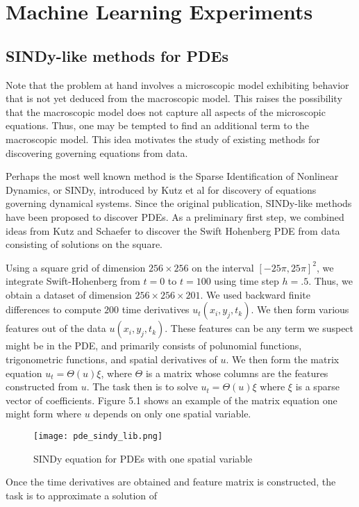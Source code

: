 \documentclass[12pt]{article}
\numberwithin{equation}{section}
\begin{document}
\section{Machine Learning Experiments}
\subsection{SINDy-like methods for PDEs}
\par Note that the problem at hand involves a microscopic model exhibiting behavior that is not yet deduced from the macroscopic model. This raises the possibility that the macroscopic model does not capture all aspects of the microscopic equations. Thus, one may be tempted to find an additional term to the macroscopic model. This idea motivates the study of existing methods for discovering governing equations from data.
\par Perhaps the most well known method is the Sparse Identification of Nonlinear Dynamics, or SINDy, introduced by Kutz et al for discovery of equations governing dynamical systems. Since the original publication, SINDy-like methods have been proposed to discover PDEs. As a preliminary first step, we combined ideas from Kutz and Schaefer to discover the Swift Hohenberg PDE from data consisting of solutions on the square. 
\par Using a square grid of dimension $256 \times 256$ on the interval $[-25\pi,25\pi]^2$, we integrate Swift-Hohenberg from $t=0$ to $t=100$ using time step $h = .5$. Thus, we obtain a dataset of dimension $256 \times 256 \times 201$. We used backward finite differences to compute $200$ time derivatives $u_t(x_i,y_j,t_k)$. We then form various features out of the data $u(x_i,y_j,t_k)$. These features can be any term we suspect might be in the PDE, and primarily consists of polunomial functions, trigonometric functions, and spatial derivatives of $u$. We then form the matrix equation $u_t = \Theta(u)\xi$, where $\Theta$ is a matrix whose columns are the features constructed from $u$. The task then is to solve $u_t = \Theta(u)\xi$ where $\xi$ is a sparse vector of coefficients. Figure 5.1 shows an example of the matrix equation one might form where $u$ depends on only one spatial variable.
\begin{figure}
\centering
\texttt{[image: pde\_sindy\_lib.png]}
\caption{SINDy equation for PDEs with one spatial variable}
\end{figure}
\par Once the time derivatives are obtained and feature matrix is constructed, the task is to approximate a solution of
\end{document}
